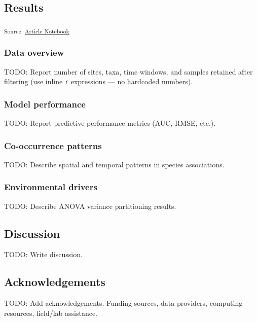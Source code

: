 \documentclass[
  12pt,
]{article}
\begin{document}
\subsection{Results}\label{results}

\protect{}\label{cell-fig-cooccurrence-overview}
\textsubscript{Source:
\href{https://OndrejMottl.github.io/BIODYNAMICS-vegetation-cooccurrence/manuscript.qmd.html}{Article
Notebook}}

\subsubsection{Data overview}\label{data-overview}

TODO: Report number of sites, taxa, time windows, and samples retained
after filtering (use inline \texttt{r} expressions --- no hardcoded
numbers).

\subsubsection{Model performance}\label{model-performance}

TODO: Report predictive performance metrics (AUC, RMSE, etc.).

\subsubsection{Co-occurrence patterns}\label{co-occurrence-patterns}

TODO: Describe spatial and temporal patterns in species associations.

\subsubsection{Environmental drivers}\label{environmental-drivers}

TODO: Describe ANOVA variance partitioning results.

\subsection{Discussion}\label{discussion}

TODO: Write discussion.

\subsection{Acknowledgements}\label{acknowledgements}

TODO: Add acknowledgements. Funding sources, data providers, computing
resources, field/lab assistance.
\end{document}
